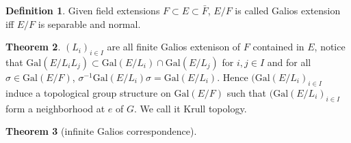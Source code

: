 \documentclass[a4paper,12pt]{article}
\theoremstyle{definition}
\newtheorem{defn}{Definition}[subsection]
\newtheorem{theo}[defn]{Theorem}
\begin{document}
\begin{defn}
    Given field extensions $F\subset E\subset \bar{F}$, $E/F$ is called Galios extension iff $E/F$ is separable and normal.
\end{defn}
\begin{theo}
    $(L_i)_{i\in I}$ are all finite Galios extenison of $F$ contained in $E$, notice that $\text{Gal}(E/L_i L_j)\subset \text{Gal}(E/L_i)\cap  \text{Gal}(E/L_j)$ for $i,j\in I$ and
    for all $\sigma \in \text{Gal}(E/F)$, $\sigma^{-1}\text{Gal}(E/L_i)\sigma=\text{Gal}(E/L_i)$. Hence $(\text{Gal}(E/L_i)_{i\in I}$ induce a topological group structure on $\text{Gal}(E/F)$ such that 
    $(\text{Gal}(E/L_i)_{i\in I}$ form a neighborhood at $e$ of $G$. We call it Krull topology.
\end{theo}





\begin{theo}[infinite Galios correspondence]

\end{theo}






\newpage
\end{document}
